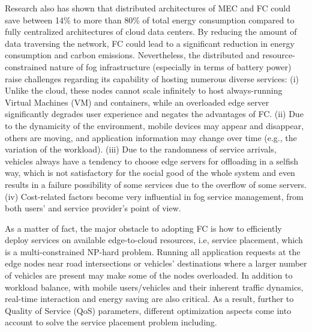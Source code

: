 \documentclass[twocolumn]{article}
\begin{document}
\par Research also has shown that distributed architectures of MEC and FC could save between 14\% to more than 80\% of total energy consumption compared to fully centralized architectures of cloud data centers\cite{ahvar2019estimating,yan2019modeling}. By reducing the amount of data traversing the network, FC could lead to a significant reduction in energy consumption and carbon emissions. 
Nevertheless, the distributed and resource-constrained nature of fog infrastructure (especially in terms of battery power) raise challenges regarding its capability of hosting numerous diverse services: (i) Unlike the cloud, these nodes cannot scale infinitely to host always-running Virtual Machines (VM) and containers, while an overloaded edge server significantly degrades user experience and negates the advantages of FC\cite{satria2017recovery,baresi2017empowering}.
(ii) Due to the dynamicity of the environment, mobile devices may appear and disappear, others are moving, and application information may change over time (e.g., the variation of the workload).  (iii) Due to the randomness of service arrivals, vehicles always have a tendency to choose edge servers for offloading in a selfish way, which is not satisfactory for the social good of the whole system and even results in a failure possibility of some services due to the overflow of some servers\cite{li2019compound}. (iv) Cost-related factors become very influential in fog service management, from both users' and service provider's point of view. 

\par As a matter of fact, the major obstacle to adopting FC is how to efficiently deploy services on available edge-to-cloud resources\cite{salaht2020overview,nezami2021decentralized}, i.e, service placement, which is a multi-constrained NP-hard problem\cite{brogi2017,bokhari1981mapping}. Running all application requests at the edge nodes near road intersections or vehicles' destinations where a larger number of vehicles are present may make some of the nodes overloaded. In addition to workload balance, with mobile users/vehicles and their inherent traffic dynamics, real-time interaction and energy saving are also critical\cite{salaht2020overview,nezami2021decentralized,colistra2015task,brogi2017,yousefpour2019fogplan,he2013mobility,luan2013engineering,lu2014connected}.
As a result, further to Quality of Service (QoS) parameters, different optimization aspects come into account\cite{salaht2020overview,yousefpour2019all} to solve the service placement problem including.
\end{document}
